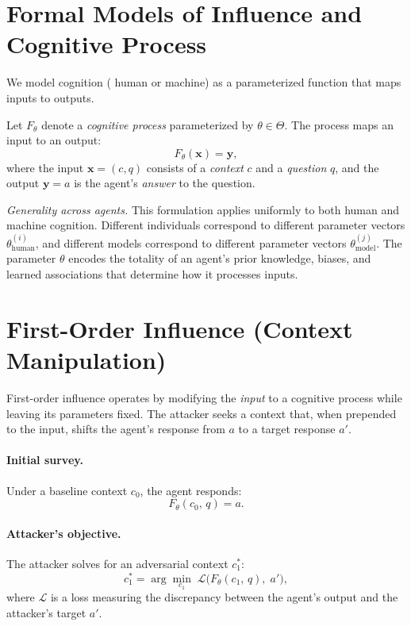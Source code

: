 \section{Formal Models of Influence and Cognitive Process }
\label{appendix:formal-model}
 We model cognition ( human or machine) as a parameterized function that maps inputs to outputs.
 
\begin{definition}
Let $F_\theta$ denote a \emph{cognitive process} parameterized by $\theta \in \Theta$. The process maps an input to an output:
\begin{equation}
    F_\theta(\mathbf{x}) = \mathbf{y},
\end{equation}
where the input $\mathbf{x} = (c, q)$ consists of a \emph{context} $c$ and a \emph{question} $q$, and the output $\mathbf{y} = a$ is the agent's \emph{answer} to the question.
\end{definition}
 
\textit{Generality across agents.} This formulation applies uniformly to both human and machine cognition. Different individuals correspond to different parameter vectors $\theta_{\mathrm{human}}^{(i)}$, and different models correspond to different parameter vectors $\theta_{\mathrm{model}}^{(j)}$. The parameter $\theta$ encodes the totality of an agent's prior knowledge, biases, and learned associations that determine how it processes inputs.
 
\section{First-Order Influence (Context Manipulation)}
 
First-order influence operates by modifying the \emph{input} to a cognitive process while leaving its parameters fixed. The attacker seeks a context that, when prepended to the input, shifts the agent's response from $a$ to a target response $a'$.
 
\paragraph{Initial survey.} Under a baseline context $c_0$, the agent responds:
\begin{equation}
    F_\theta(c_0,\, q) = a.
\end{equation}
 
\paragraph{Attacker's objective.} The attacker solves for an adversarial context $c_1^*$:
\begin{equation}
    c_1^* = \arg\min_{c_1} \; \mathcal{L}\!\bigl(F_\theta(c_1,\, q),\; a'\bigr),
\end{equation}
where $\mathcal{L}$ is a loss measuring the discrepancy between the agent's output and the attacker's target $a'$.
 
